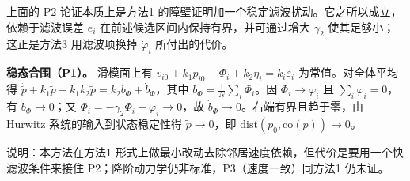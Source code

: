 \begin{remark}[关于滤波条件]
上面的 P2 论证本质上是方法1 的障壁证明加一个稳定滤波扰动。它之所以成立，依赖于滤波误差 $e_i$ 在前述候选区间内保持有界，并可通过增大 $\gamma_2$ 使其足够小；这正是方法3 用滤波项换掉 $\dot\varphi_i$ 所付出的代价。
\end{remark}

\textbf{稳态合围（P1）。} 滑模面上有 $v_{i0}+k_1p_{i0}-\Phi_i+k_2\eta_i=k_i\varepsilon_i$ 为常值。对全体平均得 $\ddot{\tilde p}+k_1\dot{\tilde p}+k_1k_2\tilde p=k_2b_\Phi+\dot b_\Phi$，其中 $b_\Phi=\frac1N\sum_i\Phi_i$。因 $\Phi_i\to\varphi_i$ 且 $\sum_i\varphi_i=0$，有 $b_\Phi\to0$；又 $\dot\Phi_i=-\gamma_2\Phi_i+\varphi_i\to0$，故 $\dot b_\Phi\to0$。右端有界且趋于零，由 Hurwitz 系统的输入到状态稳定性得 $\tilde p\to0$，即 $\mathrm{dist}(p_0,\mathrm{co}(p))\to0$。

说明：本方法在方法1 形式上做最小改动去除邻居速度依赖，但代价是要用一个快滤波条件来接住 P2；降阶动力学仍非标准，P3（速度一致）同方法1 仍未证。
